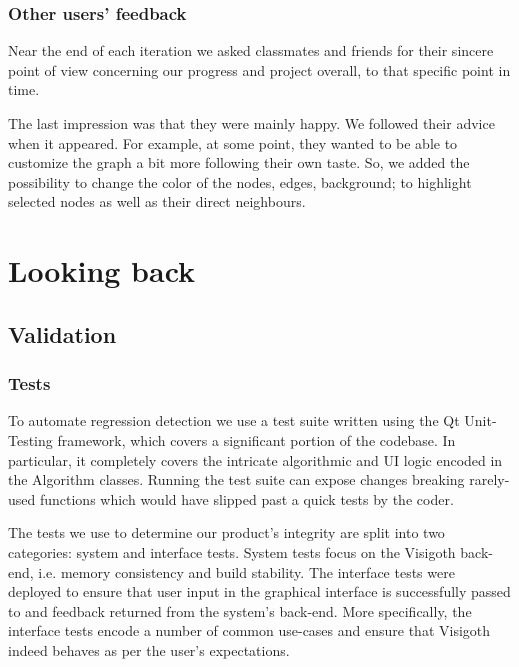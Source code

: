 \documentclass[a4paper,11pt,titlepage]{article}
\let\stdsection\section         %
\renewcommand{\section}{\newpage\stdsection}
\begin{document}
\subsubsection{Other users' feedback}
Near the end of each iteration we asked classmates and friends for
their sincere point of view concerning our progress and project
overall, to that specific point in time.

The last impression was that they were mainly happy. We followed their
advice when it appeared. For example, at some point, they wanted to be
able to customize the graph a bit more following their own taste. So,
we added the possibility to change the color of the nodes, edges,
background; to highlight selected nodes as well as their direct
neighbours.



\section{Looking back}

\subsection{Validation}

\subsubsection{Tests}
To automate regression detection we use a test suite written using
the Qt Unit-Testing framework, which covers a significant portion
of the codebase. In particular, it completely covers the intricate
algorithmic and UI logic encoded in the Algorithm classes. Running
the test suite can expose changes breaking rarely-used functions
which would have slipped past a quick tests by the coder.

The tests we use to determine our product's integrity are split
into two categories: system and interface tests. System tests focus
on the Visigoth back-end, i.e. memory consistency and build stability.
The interface tests were deployed to ensure that user input in the
graphical interface is successfully passed to and feedback returned
from the system's back-end. More specifically, the interface tests
encode a number of common use-cases and ensure that Visigoth indeed
behaves as per the user's expectations.
\end{document}

